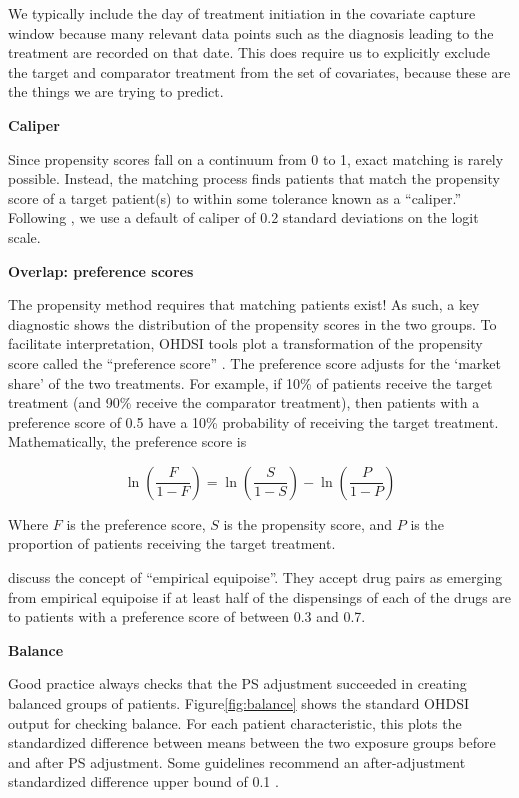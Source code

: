 \documentclass[]{book}
\let\BeginKnitrBlock\begin \let\EndKnitrBlock\end
\begin{document}
\BeginKnitrBlock{rmdimportant}
We typically include the day of treatment initiation in the covariate
capture window because many relevant data points such as the diagnosis
leading to the treatment are recorded on that date. This does require us
to explicitly exclude the target and comparator treatment from the set
of covariates, because these are the things we are trying to predict.
\EndKnitrBlock{rmdimportant}

\textbf{Caliper}

Since propensity scores fall on a continuum from 0 to 1, exact matching
is rarely possible. Instead, the matching process finds patients that
match the propensity score of a target patient(s) to within some
tolerance known as a ``caliper.'' Following \citet{austin_2011}, we use
a default of caliper of 0.2 standard deviations on the logit scale.

\textbf{Overlap: preference scores}

The propensity method requires that matching patients exist! As such, a
key diagnostic shows the distribution of the propensity scores in the
two groups. To facilitate interpretation, OHDSI tools plot a
transformation of the propensity score called the ``preference score''
\citep{walker_2013}. The preference score adjusts for the `market share'
of the two treatments. For example, if 10\% of patients receive the
target treatment (and 90\% receive the comparator treatment), then
patients with a preference score of 0.5 have a 10\% probability of
receiving the target treatment. Mathematically, the preference score is

\[\ln\left(\frac{F}{1-F}\right)=\ln\left(\frac{S}{1-S}\right)-\ln\left(\frac{P}{1-P}\right)\]

Where \(F\) is the preference score, \(S\) is the propensity score, and
\(P\) is the proportion of patients receiving the target treatment.

\citet{walker_2013} discuss the concept of ``empirical equipoise''. They
accept drug pairs as emerging from empirical equipoise if at least half
of the dispensings of each of the drugs are to patients with a
preference score of between 0.3 and 0.7.

\textbf{Balance}

Good practice always checks that the PS adjustment succeeded in creating
balanced groups of patients. Figure\ref{fig:balance} shows the standard
OHDSI output for checking balance. For each patient characteristic, this
plots the standardized difference between means between the two exposure
groups before and after PS adjustment. Some guidelines recommend an
after-adjustment standardized difference upper bound of 0.1
\citep{rubin_2001}.
\end{document}
